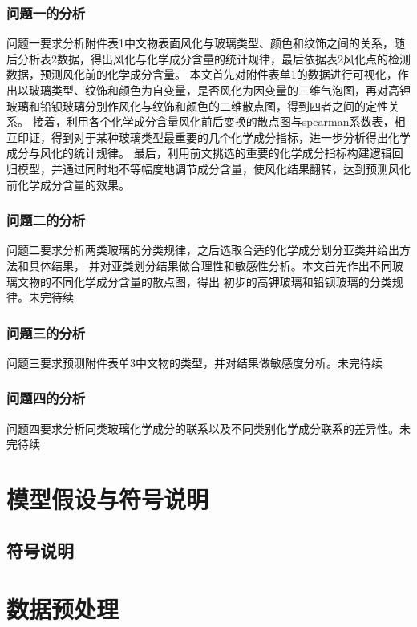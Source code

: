 \documentclass[withoutpreface,bwprint]{cumcmthesis} %
\begin{document}
\subsubsection{问题一的分析}

问题一要求分析附件表1中文物表面风化与玻璃类型、颜色和纹饰之间的关系，随后分析表2数据，得出风化与化学成分含量的统计规律，最后依据表2风化点的检测数据，预测风化前的化学成分含量。 本文首先对附件表单1的数据进行可视化，作出以玻璃类型、纹饰和颜色为自变量，是否风化为因变量的三维气泡图，再对高钾玻璃和铅钡玻璃分别作风化与纹饰和颜色的二维散点图，得到四者之间的定性关系。 接着，利用各个化学成分含量风化前后变换的散点图与spearman系数表，相互印证，得到对于某种玻璃类型最重要的几个化学成分指标，进一步分析得出化学成分与风化的统计规律。 最后，利用前文挑选的重要的化学成分指标构建逻辑回归模型，并通过同时地不等幅度地调节成分含量，使风化结果翻转，达到预测风化前化学成分含量的效果。

\subsubsection{问题二的分析}

问题二要求分析两类玻璃的分类规律，之后选取合适的化学成分划分亚类并给出方法和具体结果， 并对亚类划分结果做合理性和敏感性分析。本文首先作出不同玻璃文物的不同化学成分含量的散点图，得出 初步的高钾玻璃和铅钡玻璃的分类规律。未完待续

\subsubsection{问题三的分析}

问题三要求预测附件表单3中文物的类型，并对结果做敏感度分析。未完待续

\subsubsection{问题四的分析}

问题四要求分析同类玻璃化学成分的联系以及不同类别化学成分联系的差异性。未完待续

 
\section{模型假设与符号说明}
\subsection{符号说明}


\section{数据预处理}
\end{document}
